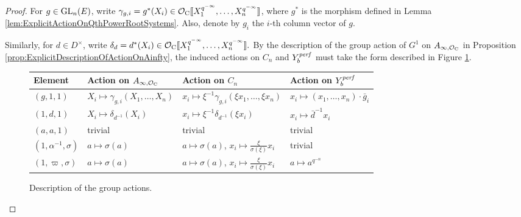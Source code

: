 \documentclass[../main.tex]{subfiles}
\begin{document}
\begin{proof}
For $g \in \operatorname{GL}_n(E)$, write $\gamma_{g,i} = g^*(X_i) 
\in \mathcal{O}_{\mathrm{C}} \llbracket X_1^{q^{-\infty}}, \dots, X_n^{q^{-\infty}} \rrbracket$, where 
$g^*$ is the morphism defined in Lemma \ref{lem:ExplicitActionOnQthPowerRootSystems}.
 Also, denote by $g_i$ the $i$-th column vector of $g$.

Similarly, for $d \in D^\times$, write $\delta_d = d^*(X_i) \in \mathcal{O}_{\mathrm{C}}\llbracket
X_1^{q^{-\infty}}, \dots, X_n^{q^{-\infty}} \rrbracket.$
By the description of the group action of $G^1$ on $A_{\infty, \mathcal{O}_{\mathrm{C}}}$
in Proposition \ref{prop:ExplicitDescriptionOfActionOnAinfty}, the induced
actions on $C_n$ and $Y_b^{\mathit{perf}}$ must take the form described in Figure
\ref{fig:TableOfGroupActionsOnModels}. 

\begin{figure}[H] 
\centering
\begin{center}
\begin{tabularx} {0.95\textwidth} { 
  |>{\centering\arraybackslash}X ||>{\centering\arraybackslash}X
  |>{\centering\arraybackslash}X |>{\centering\arraybackslash}X | }
 \hline
 Element & Action on $A_{\infty,\mathcal{O}_{\mathrm{C}}}$ & Action on $C_n$ & Action on
 $Y_b^{\mathit{perf}}$ \\ [0.5ex] 
 \hline\hline
 $(g,1,1)$ & $X_i \mapsto \gamma_{g,i}(X_1, \dots, X_n)$ & $x_i \mapsto
 \xi^{-1}\gamma_{g,i}(\xi x_1, \dots, \xi x_n)$ & $x_i \mapsto
 (x_1, \dots, x_n)\cdot\bar g_i$\\ 
 \hline
$(1,d,1)$ & $X_i \mapsto \delta_{d^{-1}}(X_i)$ & $x_i \mapsto \xi^{-1}
\delta_{d^{-1}}(\xi x_i)$ & $x_i \mapsto \bar d^{-1} x_i$ \\
 \hline
 $(a,a,1)$ & trivial & trivial & trivial \\
 \hline
 $(1, \alpha^{-1}, \sigma)$ & $a \mapsto \sigma(a)$& $a \mapsto \sigma(a)$, $x_i \mapsto  \tfrac{\xi}{\sigma(\xi)} x_i$ & trivial \\
 \hline
 $(1, \varpi, \sigma)$ & $a \mapsto \sigma(a)$& $a \mapsto \sigma(a)$, $x_i \mapsto
 \tfrac{\xi}{\sigma(\xi)} x_i$ & $a
 \mapsto a^{q^{-n}}$ \\ [1ex] 
 \hline
\end{tabularx}
\end{center}
\caption{Description of the group actions.}
\label{fig:TableOfGroupActionsOnModels}
\end{figure}


\end{proof}
\end{document}
